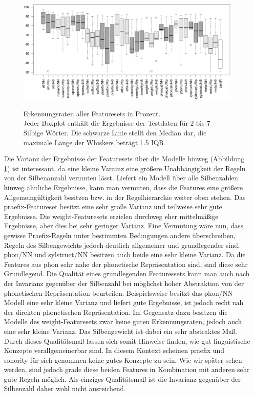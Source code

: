 \begin{figure}[h]
    \centering
    \caption{Erkennungsraten aller Featuresets in Prozent.\\
    Jeder Boxplot enthält die Ergebnisse der Testdaten für 2 bis 7 Silbige Wörter. Die schwarze Linie stellt den Median dar, die maximale Länge der Whiskers beträgt 1.5 IQR.}
    \includegraphics[width=\columnwidth]{figures/featuresets/all.png}
    \label{figure:featuresets_all}
\end{figure}
Die Varianz der Ergebnisse der Featuresets über die Modelle hinweg (Abbildung \ref{figure:featuresets_all}) ist interessant, da eine kleine Varainz eine größere Unabhängigkeit der Regeln von der Silbenanzahl vermuten lässt. Liefert ein Modell über alle Silbenzahlen hinweg ähnliche Ergebnisse, kann man vermuten, dass die Features eine größere Allgemeingültigkeit besitzen bzw. in der Regelhierarchie weiter oben stehen. Das praefix-Featureset besitzt eine sehr große Varianz und teilweise sehr gute Ergebnisse. Die weight-Featuresets erzielen durchweg eher mittelmäßige Ergebnisse, aber dies bei sehr geringer Varianz. Eine Vermutung wäre nun, dass gewisse Praefix-Regeln unter bestimmten Bedingungen andere überschreiben, Regeln des Silbengewichts jedoch deutlich allgemeiner und grundlegender sind. phon/NN und sylstruct/NN besitzen auch beide eine sehr kleine Varianz. Da die Features aus phon sehr nahe der phonetische Repräsentation sind, sind diese sehr Grundlegend.
Die Qualität eines grundlegenden Featuressets kann man auch nach der Invarianz gegenüber der Silbenzahl bei möglichst hoher Abstraktion von der phonetischen Repräsentation beurteilen. Beispielsweise besitzt das phon/NN-Modell eine sehr kleine Varianz und liefert gute Ergebnisse, ist jedoch recht nah der direkten phonetischen Repräsentation. Im Gegensatz dazu besitzen die Modelle des weight-Featuresets zwar keine guten Erkennungsraten, jedoch auch eine sehr kleine Varianz. Das Silbengewicht ist dabei ein sehr abstraktes Maß. Durch dieses Qualitätsmaß lassen sich somit Hinweise finden, wie gut linguistische Konzepte verallgemeinerbar sind. In diesem Kontext scheinen praefix und sonority für sich genommen keine gutes Konzepte zu sein.
Wie wir später sehen werden, sind jedoch grade diese beiden Features in Kombination mit anderen sehr gute Regeln möglich. Als einziges Qualitätsmaß ist die Invarianz gegenüber der Silbenzahl daher wohl nicht ausreichend.


